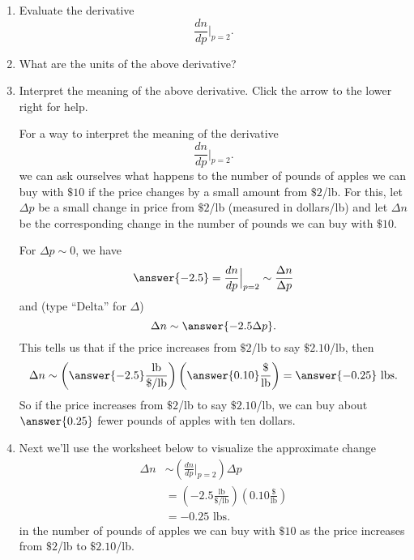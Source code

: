 \documentclass{ximera}
\begin{document}
\begin{question}
\begin{enumerate}
\item Evaluate the derivative 
\[
         \frac{dn}{dp} \Big|_{p=2} . 
\]

\item What are the units of the above derivative?

\item Interpret the meaning of the above derivative. Click the arrow to the lower right for help.

\begin{expandable}

For a way to interpret the meaning of the derivative 
\[
         \frac{dn}{dp} \Big|_{p=2} . 
\]
we can ask ourselves what happens to the number of pounds of apples we can buy with $\$10$ if the price changes by a small amount from $\$2$/lb. For this, let $\Delta p$ be a small change in price from $\$2$/lb (measured in dollars/lb) and let $\Delta n$ be the corresponding change in the number of pounds we can buy with $\$10$.

For $\Delta p \sim 0$, we have
\[
    \answer{-2.5} =  \frac{dn}{dp} \Big|_{p=2} \sim \frac{\Delta n}{\Delta p} 
\]
and (type ``Delta'' for $\Delta$)
\[
     \Delta n \sim   \answer{-2.5 \Delta p}.
\]
This tells us that if the price increases from $\$2$/lb to say $\$2.10$/lb, then 
\[
   \Delta n \sim \left( \answer{-2.5} \frac{\text{lb}}{\$/\text{lb}} \right) \left( \answer{0.10} \frac{\$}{\text{lb}}  \right) =                        \answer{-0.25}\text{ lbs}.
\]
So if the price increases from $\$2$/lb to say $\$2.10$/lb, we can buy about $\answer{0.25}$ fewer pounds of apples with ten dollars. 

\end{expandable}

\item Next we'll use the worksheet below to visualize the approximate change
\begin{align*}
  \Delta n     & \sim  \left( \frac{dn}{dp}\Big|_{p=2} \right)\Delta p \\
                   &=  \left( -2.5\frac{\text{lb}}{\$/\text{lb}} \right) \left( 0.10 \frac{\$}{\text{lb}}  \right)  \\
                   &=   -0.25\text{ lbs}.
\end{align*}
in the number of pounds of apples we can buy with $\$10$ as the price increases from $\$2$/lb to $\$2.10$/lb. 



\begin{onlineOnly}
    \begin{center}
\end{center}
\end{onlineOnly}


\end{enumerate}
\end{question}
\end{document}
